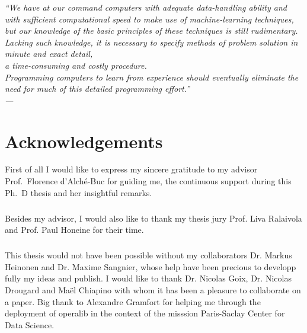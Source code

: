

\begin{flushright}{\slshape
    ``We have at our command computers with adequate data-handling ability and
    with sufficient computational speed to make use of machine-learning
    techniques, \\
    but our knowledge of the basic principles of these techniques is still
    rudimentary. \\
    Lacking such knowledge, it is necessary to specify methods of
    problem solution in minute and exact detail, \\
    a time-consuming and costly procedure. \\
    Programming computers to learn from experience should eventually
    eliminate the need for much of this detailed programming effort.'' \\
    --- 
    \citep{samuel1959some}}
\end{flushright}

\bigskip


\begingroup

\let\clearpage\relax
\let\cleardoublepage\relax
\let\cleardoublepage\relax

\chapter*{Acknowledgements}

First of all I would like to express my sincere gratitude to my advisor
Prof.~Florence d'Alch\'e-Buc for guiding me, the continuous support during this
Ph.~D thesis and her insightful remarks.
\paragraph{}
Besides my advisor, I would also like to thank my thesis jury Prof. Liva
Ralaivola and Prof. Paul Honeine for their time.
\paragraph{}
This thesis would not have been possible without my collaborators Dr. Markus
Heinonen and Dr. Maxime Sangnier, whose help have been precious to developp
fully my ideas and publish. I would like to thank Dr. Nicolas Goix, Dr. Nicolas
Drougard and Ma\"el Chiapino with whom it has been a pleasure to collaborate on
a paper. Big thank to Alexandre Gramfort for helping me through the deployment
of operalib in the context of the misssion Paris-Saclay Center for Data
Science.
